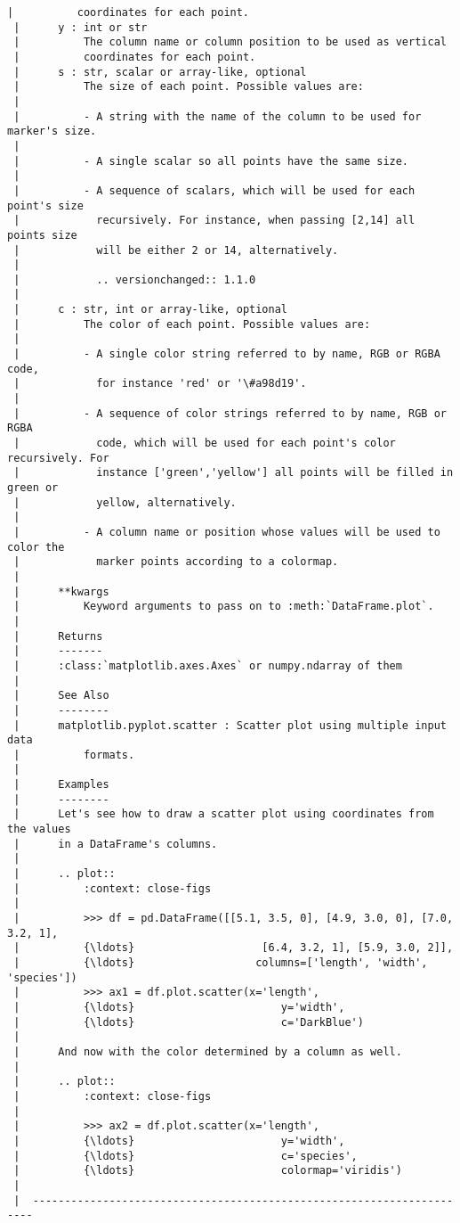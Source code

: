 \documentclass[11pt]{article}
\begin{document}
\begin{Verbatim}[commandchars=\\\{\}]
 |          coordinates for each point.
 |      y : int or str
 |          The column name or column position to be used as vertical
 |          coordinates for each point.
 |      s : str, scalar or array-like, optional
 |          The size of each point. Possible values are:
 |
 |          - A string with the name of the column to be used for marker's size.
 |
 |          - A single scalar so all points have the same size.
 |
 |          - A sequence of scalars, which will be used for each point's size
 |            recursively. For instance, when passing [2,14] all points size
 |            will be either 2 or 14, alternatively.
 |
 |            .. versionchanged:: 1.1.0
 |
 |      c : str, int or array-like, optional
 |          The color of each point. Possible values are:
 |
 |          - A single color string referred to by name, RGB or RGBA code,
 |            for instance 'red' or '\#a98d19'.
 |
 |          - A sequence of color strings referred to by name, RGB or RGBA
 |            code, which will be used for each point's color recursively. For
 |            instance ['green','yellow'] all points will be filled in green or
 |            yellow, alternatively.
 |
 |          - A column name or position whose values will be used to color the
 |            marker points according to a colormap.
 |
 |      **kwargs
 |          Keyword arguments to pass on to :meth:`DataFrame.plot`.
 |
 |      Returns
 |      -------
 |      :class:`matplotlib.axes.Axes` or numpy.ndarray of them
 |
 |      See Also
 |      --------
 |      matplotlib.pyplot.scatter : Scatter plot using multiple input data
 |          formats.
 |
 |      Examples
 |      --------
 |      Let's see how to draw a scatter plot using coordinates from the values
 |      in a DataFrame's columns.
 |
 |      .. plot::
 |          :context: close-figs
 |
 |          >>> df = pd.DataFrame([[5.1, 3.5, 0], [4.9, 3.0, 0], [7.0, 3.2, 1],
 |          {\ldots}                    [6.4, 3.2, 1], [5.9, 3.0, 2]],
 |          {\ldots}                   columns=['length', 'width', 'species'])
 |          >>> ax1 = df.plot.scatter(x='length',
 |          {\ldots}                       y='width',
 |          {\ldots}                       c='DarkBlue')
 |
 |      And now with the color determined by a column as well.
 |
 |      .. plot::
 |          :context: close-figs
 |
 |          >>> ax2 = df.plot.scatter(x='length',
 |          {\ldots}                       y='width',
 |          {\ldots}                       c='species',
 |          {\ldots}                       colormap='viridis')
 |
 |  ----------------------------------------------------------------------

\end{Verbatim}
\end{document}
